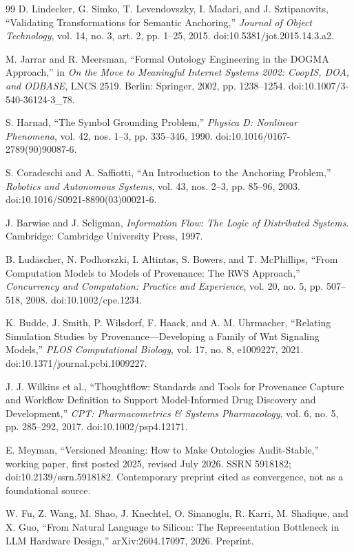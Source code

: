 \documentclass[11pt,a4paper]{article}
\begin{document}
\begin{thebibliography}{99}
D. Lindecker, G. Simko, T. Levendovszky, I. Madari, and J. Sztipanovits, ``Validating Transformations for Semantic Anchoring,'' \emph{Journal of Object Technology}, vol. 14, no. 3, art. 2, pp. 1--25, 2015. doi:10.5381/jot.2015.14.3.a2.

M. Jarrar and R. Meersman, ``Formal Ontology Engineering in the DOGMA Approach,'' in \emph{On the Move to Meaningful Internet Systems 2002: CoopIS, DOA, and ODBASE}, LNCS 2519. Berlin: Springer, 2002, pp. 1238--1254. doi:10.1007/3-540-36124-3\_78.

S. Harnad, ``The Symbol Grounding Problem,'' \emph{Physica D: Nonlinear Phenomena}, vol. 42, nos. 1--3, pp. 335--346, 1990. doi:10.1016/0167-2789(90)90087-6.

S. Coradeschi and A. Saffiotti, ``An Introduction to the Anchoring Problem,'' \emph{Robotics and Autonomous Systems}, vol. 43, nos. 2--3, pp. 85--96, 2003. doi:10.1016/S0921-8890(03)00021-6.

J. Barwise and J. Seligman, \emph{Information Flow: The Logic of Distributed Systems}. Cambridge: Cambridge University Press, 1997.

B. Lud{\"a}scher, N. Podhorszki, I. Altintas, S. Bowers, and T. McPhillips, ``From Computation Models to Models of Provenance: The RWS Approach,'' \emph{Concurrency and Computation: Practice and Experience}, vol. 20, no. 5, pp. 507--518, 2008. doi:10.1002/cpe.1234.

K. Budde, J. Smith, P. Wilsdorf, F. Haack, and A. M. Uhrmacher, ``Relating Simulation Studies by Provenance---Developing a Family of Wnt Signaling Models,'' \emph{PLOS Computational Biology}, vol. 17, no. 8, e1009227, 2021. doi:10.1371/journal.pcbi.1009227.

J. J. Wilkins et al., ``Thoughtflow: Standards and Tools for Provenance Capture and Workflow Definition to Support Model-Informed Drug Discovery and Development,'' \emph{CPT: Pharmacometrics \& Systems Pharmacology}, vol. 6, no. 5, pp. 285--292, 2017. doi:10.1002/psp4.12171.

E. Meyman, ``Versioned Meaning: How to Make Ontologies Audit-Stable,'' working paper, first posted 2025, revised July 2026. SSRN 5918182; doi:10.2139/ssrn.5918182. Contemporary preprint cited as convergence, not as a foundational source.

W. Fu, Z. Wang, M. Shao, J. Knechtel, O. Sinanoglu, R. Karri, M. Shafique, and X. Guo, ``From Natural Language to Silicon: The Representation Bottleneck in LLM Hardware Design,'' arXiv:2604.17097, 2026. Preprint.


\end{thebibliography}
\end{document}
